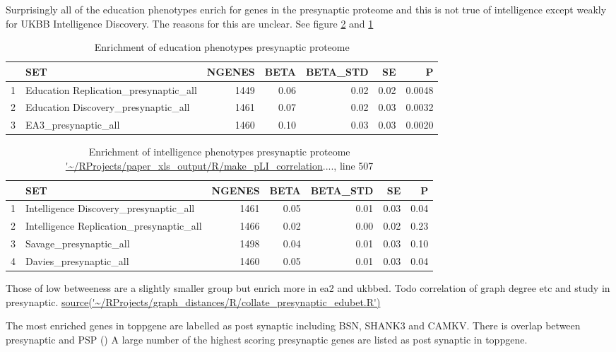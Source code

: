 Surprisingly all of the education phenotypes enrich for genes in the presynaptic proteome and this is not true of intelligence except weakly for UKBB Intelligence Discovery. The reasons for this are unclear. See figure \ref{Table:Enrichment of intelligence phenotypes presynaptic proteome} and \ref{Table:Enrichment of education phenotypes presynaptic proteome}
 


\begin{table}
\centering
\begin{tabular}{rlrrrrr}
  \hline
 & SET & NGENES & BETA & BETA\_STD & SE & P \\ 
  \hline
1 & Education Replication\_presynaptic\_all & 1449 & 0.06 & 0.02 & 0.02 & 0.0048 \\ 
  2 & Education Discovery\_presynaptic\_all & 1461 & 0.07 & 0.02 & 0.03 & 0.0032 \\ 
  3 & EA3\_presynaptic\_all & 1460 & 0.10 & 0.03 & 0.03 & 0.0020 \\ 
   \hline
\end{tabular}
\caption{Enrichment of education phenotypes presynaptic proteome} 
\label{Table:Enrichment of education phenotypes presynaptic proteome}
\end{table}




\begin{table}[ht]
\centering
\begin{tabular}{rlrrrrr}
  \hline
 & SET & NGENES & BETA & BETA\_STD & SE & P \\ 
  \hline 

1 & Intelligence Discovery\_presynaptic\_all & 1461 & 0.05 & 0.01 & 0.03 & 0.04 \\ 
  2 & Intelligence Replication\_presynaptic\_all & 1466 & 0.02 & 0.00 & 0.02 & 0.23 \\ 
  3 & Savage\_presynaptic\_all & 1498 & 0.04 & 0.01 & 0.03 & 0.10 \\ 
  4 & Davies\_presynaptic\_all & 1460 & 0.05 & 0.01 & 0.03 & 0.04 \\ 
   \hline
\end{tabular}
\caption{Enrichment of intelligence phenotypes presynaptic proteome \url{'~/RProjects/paper_xls_output/R/make_pLI_correlation}...., line 507} 
\label{Table:Enrichment of intelligence phenotypes presynaptic proteome}
\end{table}

Those of low betweeness are a slightly smaller group but enrich more in ea2 and ukbbed. Todo correlation of graph degree etc and study in presynaptic. \url{source('~/RProjects/graph_distances/R/collate_presynaptic_edubet.R')}
 

The most enriched genes in toppgene are labelled as post synaptic including BSN, SHANK3 and CAMKV. There is overlap between presynaptic and PSP () A large number of the highest scoring presynaptic genes are listed as post synaptic in toppgene. 

